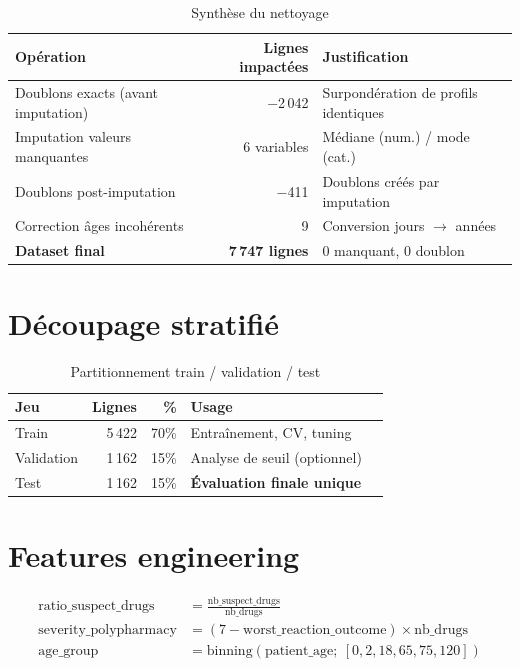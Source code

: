 \documentclass[11pt,a4paper,twoside,openright]{report}
\begin{document}
\begin{table}[H]
  \centering
  \caption{Synthèse du nettoyage}
  \label{tab:cleaning}
  \begin{tabular}{lrl}
    \toprule
    \textbf{Opération} & \textbf{Lignes impactées} & \textbf{Justification} \\
    \midrule
    Doublons exacts (avant imputation) & $-$2\,042 & Surpondération de profils identiques \\
    Imputation valeurs manquantes & 6 variables & Médiane (num.) / mode (cat.) \\
    Doublons post-imputation & $-$411 & Doublons créés par imputation \\
    Correction âges incohérents & 9 & Conversion jours $\rightarrow$ années \\
    \midrule
    \textbf{Dataset final} & \textbf{7\,747 lignes} & 0 manquant, 0 doublon \\
    \bottomrule
  \end{tabular}
\end{table}

\section{Découpage stratifié}

\begin{table}[H]
  \centering
  \caption{Partitionnement train / validation / test}
  \label{tab:split}
  \begin{tabular}{lrrlp{4.5cm}}
    \toprule
    \textbf{Jeu} & \textbf{Lignes} & \textbf{\%} & \textbf{Usage} \\
    \midrule
    Train       & 5\,422 & 70\% & Entraînement, CV, tuning \\
    Validation  & 1\,162 & 15\% & Analyse de seuil (optionnel) \\
    Test        & 1\,162 & 15\% & \textbf{Évaluation finale unique} \\
    \bottomrule
  \end{tabular}
\end{table}

\section{Features engineering}

\begin{align}
  \text{ratio\_suspect\_drugs} &= \frac{\text{nb\_suspect\_drugs}}{\text{nb\_drugs}} \label{eq:ratio}\\
  \text{severity\_polypharmacy} &= (7 - \text{worst\_reaction\_outcome}) \times \text{nb\_drugs} \label{eq:sev}\\
  \text{age\_group} &= \text{binning}(\text{patient\_age};\ [0,2,18,65,75,120]) \label{eq:age}
\end{align}
\end{document}
